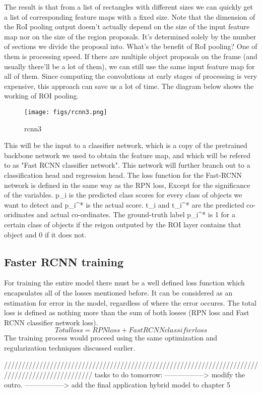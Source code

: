 The result is that from a list of rectangles with different sizes we can quickly get a list of corresponding feature maps with a fixed size. Note that the dimension of the RoI pooling output doesn’t actually depend on the size of the input feature map nor on the size of the region proposals. It’s determined solely by the number of sections we divide the proposal into. What’s the benefit of RoI pooling? One of them is processing speed. If there are multiple object proposals on the frame (and usually there’ll be a lot of them), we can still use the same input feature map for all of them. Since computing the convolutions at early stages of processing is very expensive, this approach can save us a lot of time. The diagram below shows the working of ROI pooling.
\begin{figure}[ht]
	\centering
	\texttt{[image: figs/rcnn3.png]}
	\caption{rcnn3}\label{fig:rcnn3}
\end{figure}
This will be the input to a classifier network, which is a copy of the pretrained backbone network we used to obtain the feature map, and which will be refered to as "Fast RCNN classifier network". This network will further branch out to a classification head and regression head. The loss function for the Fast-RCNN
 network is defined in the same way as the RPN loss, Except for the significance of the variables. p_{i} is the predicted class scores for every class of objects we want to detect and p_{i}^* is the actual score. t_{i} and t_{i}^* are the predicted co-oridinates and actual co-ordinates. The ground-truth label p_{i}^* is 1 for a certain class of objects if the reigon outputed by the ROI layer contains that object and 0 if it does not.
\subsection{Faster RCNN training}
For training the entire model there must be a well defined loss function which encapsulates all of the losses mentioned before. It can be considered as an estimation for
error in the model, regardless of where the error occures. The total loss is defined as nothing more than the sum of both losses (RPN loss and Fast RCNN classifier network loss).
$$
Total loss = RPN loss + Fast RCNN classifier loss
$$
The training process would proceed using the same optimization and regularization techniques discussed earlier.


/////////////////////////////////////////////////////////////////////////////////////////////////
tasks to do tomorrow:
-----------------> modify the outro.
-----------------> add the final application hybrid model to chapter 5




